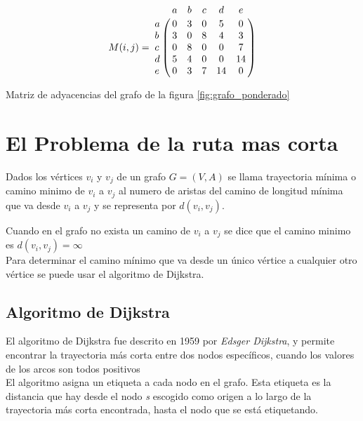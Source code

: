         \begin{table}[H]
          \begin{center}
            \begin{displaymath}
              M(i,j) =
              \bordermatrix{ ~ & a & b & c & d & e \cr
                             a & 0 & 3 & 0 & 5 & 0 \cr
                             b & 3 & 0 & 8 & 4 & 3 \cr
                             c & 0 & 8 & 0 & 0 & 7 \cr
                             d & 5 & 4 & 0 & 0 & 14\cr
                             e & 0 & 3 & 7 & 14& 0  }
            \end{displaymath}
            \caption*{Matriz de adyacencias del grafo de la figura  \ref{fig:grafo_ponderado}}
          \end{center}
        \end{table}



    \section{El Problema de la ruta mas corta} %
    \label{sec:ruta_mas_corta}
      Dados los vértices $v_{i}$ y $v_{j}$ de un grafo $G = (V,A)$ se llama trayectoria mínima o camino minimo  de \(v_i\) a \(v_j\) al numero de aristas del camino de longitud mínima que va desde $v_i$ a $v_j$ y se representa por $d(v_i, v_j)$.

      Cuando en el grafo no exista un camino de $v_i$ a $v_j$ se dice que el camino minimo es $d(v_i, v_j) = \infty$ \\

      Para determinar el camino mínimo que va desde un único vértice a cualquier otro vértice se puede usar el algoritmo de Dijkstra.



      \subsection{Algoritmo de Dijkstra} %
      \label{sub:algoritmo_de_dijkstra}
      El algoritmo de  Dijkstra fue descrito en 1959 por \emph{Edsger Dijkstra}, y permite encontrar la trayectoria más corta entre dos nodos específicos, cuando los valores de los arcos son todos positivos\\

      El algoritmo asigna un etiqueta a cada nodo en el grafo. Esta etiqueta es la distancia que hay desde el nodo \emph{s} escogido como origen a lo largo de la trayectoria más corta encontrada, hasta el nodo que se está etiquetando.\\

